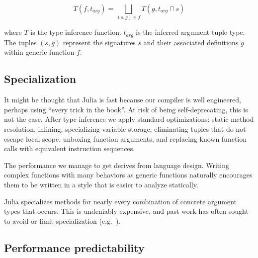 \[
T(f,t_{arg}) = \bigsqcup_{(s,g) \in f}T(g,t_{arg} \sqcap s)
\]

\noindent
where $T$ is the type inference function.
$t_{arg}$ is the inferred argument tuple type.
The tuples $(s,g)$ represent the signatures $s$ and their associated
definitions $g$ within generic function $f$.


\subsection{Specialization}

It might be thought that Julia is fast because our compiler is well
engineered, perhaps using ``every trick in the book''.
At risk of being self-deprecating, this is not the case.
After type inference we apply standard optimizations: static method
resolution, inlining, specializing variable storage, eliminating tuples
that do not escape local scope, unboxing function arguments, and
replacing known function calls with equivalent instruction sequences.

The performance we manage to get derives from language design.
Writing complex functions with many behaviors as generic functions
naturally encourages them to be written in a style that is easier to
analyze statically.

Julia specializes methods for nearly every combination of concrete
argument types that occurs.
This is undeniably expensive, and past work has often sought to avoid
or limit specialization (e.g.\ \cite{Dragos:2009:CGT:1565824.1565830}).


\iffalse
\subsection{Method changes}
You can always specialize on constants, but you might want to specialize
on the current state of something that changes.
This is really difficult to do.
A system for adding methods as code is loaded provides this.
Method tables can be seen as elaborate mutable hash tables that come with
a protocol for keeping the system consistent under changes.
\fi


\subsection{Performance predictability}

